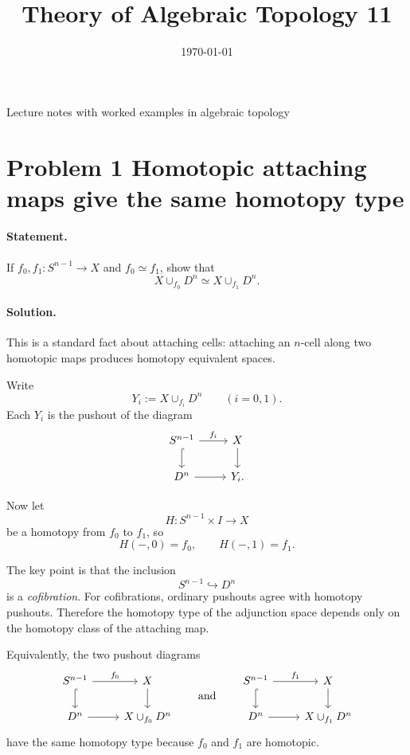 \documentclass[12pt,a4paper]{article}
\title{\vspace{-1.5em}\bfseries Theory of Algebraic Topology 11}
\author{}
\date{\today}
\theoremstyle{notespace}
\begin{document}
	\maketitle
	\thispagestyle{plain}
		\begin{center}
		\begin{minipage}{0.92\textwidth}
			Lecture notes with worked examples in algebraic topology
		\end{minipage}
	\end{center}
		\tableofcontents
	\clearpage

\section{Problem 1 Homotopic attaching maps give the same homotopy type}

\paragraph{Statement.}
If \(f_0,f_1:S^{n-1}\to X\) and \(f_0\simeq f_1\), show that
\[
X\cup_{f_0} D^n \simeq X\cup_{f_1} D^n .
\]

\paragraph{Solution.}
This is a standard fact about attaching cells: attaching an \(n\)-cell along two homotopic maps produces homotopy equivalent spaces.

Write
\[
Y_i:=X\cup_{f_i}D^n \qquad (i=0,1).
\]
Each \(Y_i\) is the pushout of the diagram
\[
\begin{tikzcd}
	S^{n-1} \arrow[r,"f_i"] \arrow[d,hook] & X \arrow[d] \\
	D^n \arrow[r] & Y_i .
\end{tikzcd}
\]

Now let
\[
H:S^{n-1}\times I \to X
\]
be a homotopy from \(f_0\) to \(f_1\), so
\[
H(-,0)=f_0,\qquad H(-,1)=f_1.
\]

The key point is that the inclusion
\[
S^{n-1}\hookrightarrow D^n
\]
is a \emph{cofibration}. For cofibrations, ordinary pushouts agree with homotopy pushouts. Therefore the homotopy type of the adjunction space depends only on the homotopy class of the attaching map.

Equivalently, the two pushout diagrams
\[
\begin{tikzcd}
	S^{n-1} \arrow[r,"f_0"] \arrow[d,hook] & X \arrow[d] \\
	D^n \arrow[r] & X\cup_{f_0}D^n
\end{tikzcd}
\qquad\text{and}\qquad
\begin{tikzcd}
	S^{n-1} \arrow[r,"f_1"] \arrow[d,hook] & X \arrow[d] \\
	D^n \arrow[r] & X\cup_{f_1}D^n
\end{tikzcd}
\]
have the same homotopy type because \(f_0\) and \(f_1\) are homotopic.
\end{document}
